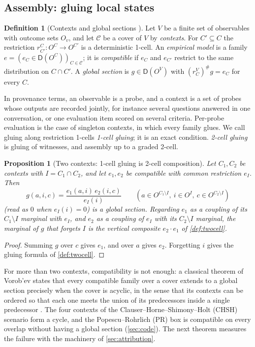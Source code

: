 \documentclass[11pt]{article}
\newtheorem{proposition}[theorem]{Proposition}
\theoremstyle{definition}
\newtheorem{definition}[theorem]{Definition}
\theoremstyle{remark}
\newcommand{\D}{\mathsf{D}}
\begin{document}
\subsection{Assembly: gluing local states}\label{sec:assembly}

\begin{definition}[Contexts and global sections \cite{AbramskyBrandenburger2011}]\label{def:contexts}
Let $V$ be a finite set of observables with outcome sets $O_v$, and let $\mathcal C$ be a cover of $V$
by \emph{contexts}. For $C'\subseteq C$ the restriction $r^C_{C'}\colon O^C\to O^{C'}$ is a
deterministic 1-cell. An \emph{empirical model} is a family $e=(e_C\in\D(O^C))_{C\in\mathcal C}$; it is
\emph{compatible} if $e_C$ and $e_{C'}$ restrict to the same distribution on $C\cap C'$. A
\emph{global section} is $g\in\D(O^V)$ with $(r^V_C)^\#g=e_C$ for every $C$.
\end{definition}

In provenance terms, an observable is a probe, and a context is a set of probes whose outputs are
recorded jointly, for instance several questions answered in one conversation, or one evaluation
item scored on several criteria. Per-probe evaluation is the case of singleton contexts, in which
every family glues. We call gluing along restriction 1-cells \emph{1-cell gluing}; it is an exact
condition. \emph{2-cell gluing} is gluing of witnesses, and assembly up to a graded 2-cell.

\begin{proposition}[Two contexts: 1-cell gluing is 2-cell composition]\label{prop:twoctx}
Let $C_1,C_2$ be contexts with $I=C_1\cap C_2$, and let $e_1,e_2$ be compatible with common
restriction $e_I$. Then
\[
g(a,i,c)=\frac{e_1(a,i)\,e_2(i,c)}{e_I(i)}\qquad(a\in O^{C_1\setminus I},\ i\in O^I,\ c\in O^{C_2\setminus I})
\]
(read as $0$ when $e_I(i)=0$) is a global section. Regarding $e_1$ as a coupling of its $C_1\setminus I$ marginal with $e_I$, and
$e_2$ as a coupling of $e_I$ with its $C_2\setminus I$ marginal, the marginal of $g$ that forgets $I$
is the vertical composite $e_2\cdot e_1$ of \cref{def:twocell}.
\end{proposition}
\begin{proof}
Summing $g$ over $c$ gives $e_1$, and over $a$ gives $e_2$. Forgetting $i$ gives the gluing formula of
\cref{def:twocell}.
\end{proof}

For more than two contexts, compatibility is not enough: a classical theorem of Vorob'ev states that
every compatible family over a cover extends to a global section precisely when the cover is
acyclic, in the sense that its contexts can be ordered so that each one meets the union of its
predecessors inside a single predecessor \cite{Vorobev1962}. The four contexts of the
Clauser--Horne--Shimony--Holt (CHSH) scenario form a cycle, and the Popescu--Rohrlich (PR) box is
compatible on every overlap without having a global section (\cref{sec:code}). The next theorem measures
the failure with the machinery of \cref{sec:attribution}.
\end{document}
